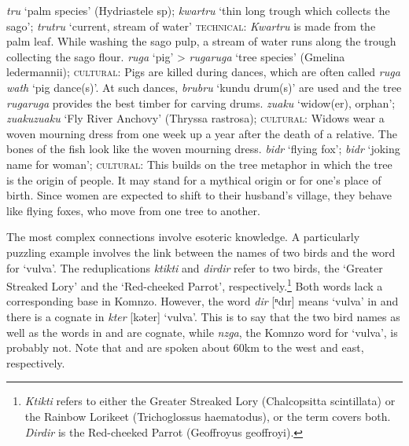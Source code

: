\begin{exe}
\ex
\label{ex639}
\begin{xlist}
	\ex \label{ex640} \emph{tru} `palm species' (Hydriastele sp); \emph{kwartru} `thin long trough which collects the sago'; \emph{trutru} `current, stream of water' \textsc{technical:} \emph{Kwartru} is made from the palm leaf. While washing the sago pulp, a stream of water runs along the trough collecting the sago flour.
	\ex \label{ex641} \emph{ruga} `pig' > \emph{rugaruga} `tree species' (Gmelina ledermannii); \textsc{cultural:} Pigs are killed during dances, which are often called \emph{ruga wath} `pig dance(s)'. At such dances, \emph{brubru} `kundu drum(s)' are used and the tree \emph{rugaruga} provides the best timber for carving drums.
	\ex \label{ex642} \emph{zuaku} `widow(er), orphan'; \emph{zuakuzuaku} `Fly River Anchovy' (Thryssa rastrosa); \textsc{cultural:} Widows wear a woven mourning dress from one week up a year after the death of a relative. The bones of the fish look like the woven mourning dress.
	\ex \label{ex643} \emph{bidr} `flying fox'; \emph{bidr} `joking name for woman'; \textsc{cultural:} This builds on the tree metaphor in which the tree is the origin of people. It may stand for a mythical origin or for one's place of birth. Since women are expected to shift to their husband's village, they behave like flying foxes, who move from one tree to another.
\end{xlist}
\end{exe}%

The most complex connections involve esoteric knowledge. A particularly puzzling example involves the link between the names of two birds and the word for `vulva'. The reduplications \emph{ktikti} and \emph{dirdir} refer to two birds, the  `Greater Streaked Lory' and the `Red-cheeked Parrot', respectively.\footnote{\emph{Ktikti} refers to either the Greater Streaked Lory (Chalcopsitta scintillata) or the Rainbow Lorikeet (Trichoglossus haematodus), or the term covers both. \emph{Dirdir} is the Red-cheeked Parrot (Geoffroyus geoffroyi).} Both words lack a corresponding base in Komnzo. However, the word \emph{dir} [{ⁿ}dır] means `vulva' in  and there is a cognate in  \emph{kter} [kəter] `vulva'. This is to say that the two bird names as well as the words in  and  are cognate, while \emph{nzga}, the Komnzo word for `vulva', is probably not. Note that  and  are spoken about 60km to the west and east, respectively.

